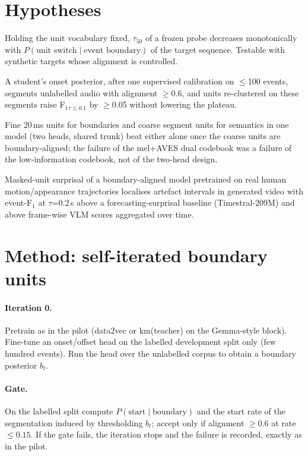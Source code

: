 \documentclass[10pt,twocolumn]{article}
\newcommand{\Fone}{F$_1$}
\begin{document}
\section{Hypotheses}
\begin{description}\setlength{\itemsep}{1pt}
\item[H-A (alignment drives localisation).] Holding the unit vocabulary fixed, $\tau_{50}$ of a frozen probe decreases monotonically with $P(\text{unit switch}\mid\text{event boundary})$ of the target sequence. Testable with synthetic targets whose alignment is controlled.
\item[H-B (self-iteration converges).] A student's onset posterior, after one supervised calibration on $\le$100 events, segments unlabelled audio with alignment $\ge$0.6, and units re-clustered on these segments raise \Fone{}$_{\tau\le0.1}$ by $\ge$0.05 without lowering the plateau.
\item[H-C (hierarchy).] Fine 20\,ms units for boundaries and coarse segment units for semantics in one model (two heads, shared trunk) beat either alone once the coarse units are boundary-aligned; the failure of the mel+AVES dual codebook was a failure of the low-information codebook, not of the two-head design.
\item[H-D (surprisal as reward).] Masked-unit surprisal of a boundary-aligned model pretrained on real human motion/appearance trajectories localises artefact intervals in generated video with event-\Fone{} at $\tau$=0.2\,s above a forecasting-surprisal baseline (Timestral-209M) and above frame-wise VLM scores aggregated over time.
\end{description}

\section{Method: self-iterated boundary units}
\paragraph{Iteration 0.} Pretrain as in the pilot (data2vec or km(teacher) on the Gemma-style block). Fine-tune an onset/offset head on the labelled development split only (few hundred events). Run the head over the unlabelled corpus to obtain a boundary posterior $b_t$.
\paragraph{Gate.} On the labelled split compute $P(\text{start}\mid\text{boundary})$ and the start rate of the segmentation induced by thresholding $b_t$; accept only if alignment $\ge0.6$ at rate $\le0.15$. If the gate fails, the iteration stops and the failure is recorded, exactly as in the pilot.
\end{document}
